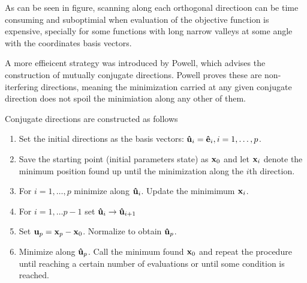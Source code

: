 As can be seen in figure, scanning along each orthogonal directioon can be time consuming and suboptimial when evaluation of the objective function is expensive, specially for some functions with long narrow valleys at some angle with the coordinates basis vectors.

A more effieicent strategy was introduced by Powell, which advises the construction of mutually conjugate directions. Powell proves these are non-iterfering directions, meaning the minimization carried at any given conjugate direction does not spoil the minimiation along any other of them.

Conjugate directions are constructed as follows
\begin{enumerate}
    \item Set the initial directions as the basis vectors: $\vu{u}_i=\vu{e}_i, i=1,\dots, p$.
    \item Save the starting point (initial parameters state) as $\vb{x}_0$ and let $\vb{x}_i$ denote the minimum position found up until the minimization along the $i$th direction.
    \item For $i=1,\dots, p$ minimize along $\vu{u}_i$. Update the minimimum $\vb{x}_i$.
    \item For $i=1,\dots p-1$ set $\vu{u}_i\to\vu{u}_{i+1}$
    \item Set $\vb{u}_p=\vb{x}_p - \vb{x}_0$. Normalize to obtain $\vu{u}_p$.
    \item Minimize along $\vu{u}_p$. Call the minimum found $\vb{x}_0$ and repeat the procedure until reaching a certain number of evaluations or until some condition is reached.
\end{enumerate}
